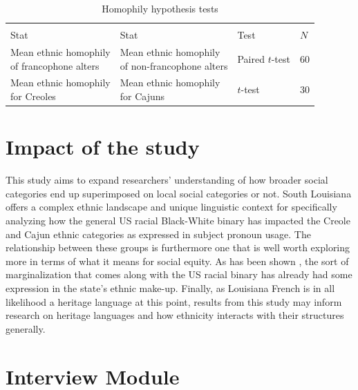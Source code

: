 \documentclass{article}\usepackage[]{graphicx}\usepackage[]{xcolor}
\begin{document}
      \begin{table}[tbhp]
        \centering
        \caption{Homophily hypothesis tests}
        \label{tab:homophily}
        \begin{tabular}{l l l l}
                                                      &                                                 &                 & \\
          Stat                                        & Stat                                            & Test            & $N$ \\
          \hline
          \pbox{\textwidth}{Mean ethnic homophily\\of francophone alters} & \pbox{\textwidth}{Mean ethnic homophily\\of non-francophone alters} & Paired $t$-test & 60 \\
          \hline
          \pbox{\textwidth}{Mean ethnic homophily\\for Creoles}           & \pbox{\textwidth}{Mean ethnic homophily\\for Cajuns}             & $t$-test        & 30 \\
        \end{tabular}
      \end{table}

  \section{Impact of the study}
    This study aims to expand researchers' understanding of how broader social categories end up superimposed on local social categories or not.
    South Louisiana offers a complex ethnic landscape and unique linguistic context for specifically analyzing how the general US racial Black-White binary has impacted the Creole and Cajun ethnic categories as expressed in subject pronoun usage.
    The relationship between these groups is furthermore one that is well worth exploring more in terms of what it means for social equity.
    As has been shown \parencite{giancarlo_dont_2019}, the sort of marginalization that comes along with the US racial binary has already had some expression in the state's ethnic make-up.
    Finally, as Louisiana French is in all likelihood a heritage language at this point, results from this study may inform research on heritage languages and how ethnicity interacts with their structures generally.

  \printbibliography

  \newpage
  \appendix
    \section{Interview Module}
      \label{app:module}
      
\end{document}
